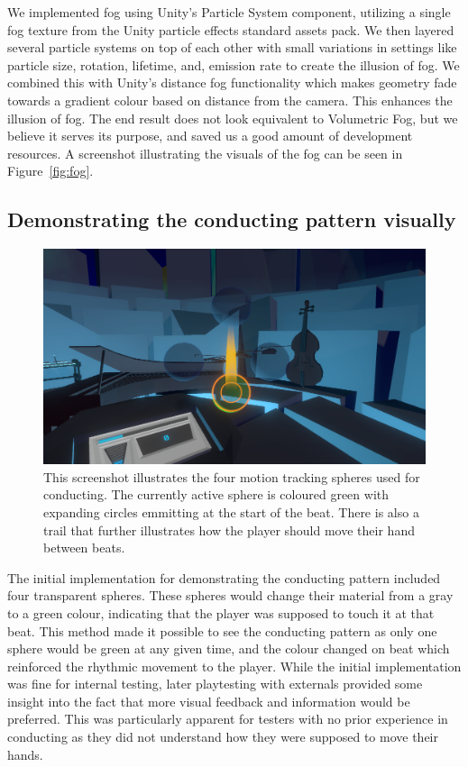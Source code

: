 We implemented fog using Unity's Particle System component, utilizing a single fog texture from the Unity particle effects standard assets pack. We then layered several particle systems on top of each other with small variations in settings like particle size, rotation, lifetime, and, emission rate to create the illusion of fog. We combined this with Unity’s distance fog functionality which makes geometry fade towards a gradient colour based on distance from the camera. This enhances the illusion of fog. The end result does not look equivalent to Volumetric Fog, but we believe it serves its purpose, and saved us a good amount of development resources. A screenshot illustrating the visuals of the fog can be seen in Figure~\ref{fig:fog}. 


\subsection{Demonstrating the conducting pattern visually}
\begin{figure}[tbph]
    \centering
    \includegraphics[width=1.0\textwidth]{images/spheres-trail-pulse}
    \caption[Screenshot of Motion Tracking Spheres]{This screenshot illustrates the four motion tracking spheres used for conducting. The currently active sphere is coloured green with expanding circles emmitting at the start of the beat. There is also a trail that further illustrates how the player should move their hand between beats.}
    \label{fig:trackingspheres}
\end{figure}
The initial implementation for demonstrating the conducting pattern included four transparent spheres. These spheres would change their material from a gray to a green colour, indicating that the player was supposed to touch it at that beat. This method made it possible to see the conducting pattern as only one sphere would be green at any given time, and the colour changed on beat which reinforced the rhythmic movement to the player. While the initial implementation was fine for internal testing, later playtesting with externals provided some insight into the fact that more visual feedback and information would be preferred. This was particularly apparent for testers with no prior experience in conducting as they did not understand how they were supposed to move their hands. 


